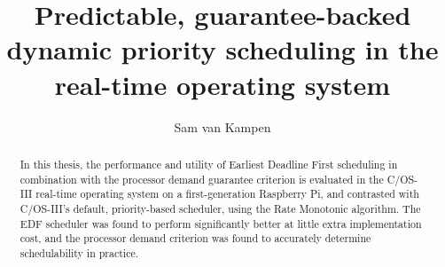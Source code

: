 \documentclass[twoside]{uva-inf-bachelor-thesis}
\title{Predictable, guarantee-backed\\dynamic priority scheduling in the \ucosiii real-time operating system}
\author{Sam van Kampen}
\newcommand{\ucosiii}{\textmu C/OS-III\xspace}
\begin{document}
\maketitle

\begin{abstract}
    In this thesis, the performance and utility of Earliest Deadline First scheduling in combination with the processor demand guarantee criterion is evaluated in the \ucosiii real-time operating system on a first-generation Raspberry Pi, and contrasted with \ucosiii's default, priority-based scheduler, using the Rate Monotonic algorithm. The EDF scheduler was found to perform significantly better at little extra implementation cost, and the processor demand criterion was found to accurately determine schedulability in practice.
\end{abstract}


\tableofcontents

%
%
%
%



%
%
%
%



%
%
%
%



%
%
%
%



%
%
%
%



%
%
%
%



%
%
%
%



%
%



{
    \hfuzz=8pt
    \printbibliography
}
\end{document}
